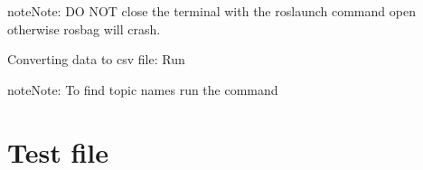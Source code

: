 \documentclass[letterpaper,10pt,english]{sphinxmanual}
\begin{document}
\begin{sphinxadmonition}{note}{Note:}
DO NOT close the terminal with the roslaunch command open otherwise rosbag will crash.
\end{sphinxadmonition}

Converting data to csv file: Run 

\begin{sphinxadmonition}{note}{Note:}
To find topic names run the command 
\end{sphinxadmonition}


\section{Test file}
\label{\detokenize{test:module-test}}\label{\detokenize{test:test-file}}\label{\detokenize{test::doc}}
\end{document}
